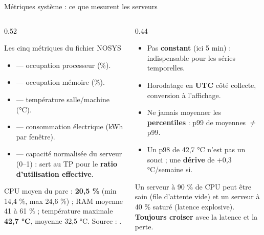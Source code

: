 \begin{frame}{Métriques système : ce que mesurent les serveurs}
\begin{columns}[t]
\begin{column}{0.52\textwidth}
\begin{block}{Les cinq métriques du fichier NOSYS}
\begin{itemize}
\item {} --- occupation processeur (\%).
\item {} --- occupation mémoire (\%).
\item {} --- température salle/machine (°C).
\item {} --- consommation électrique (kWh par fenêtre).
\item {} --- capacité normalisée du serveur (0--1) :
sert au TP pour le \textbf{ratio d'utilisation effective}.
\end{itemize}
\end{block}
\begin{ebox}
CPU moyen du parc : \textbf{20,5 \%} (min 14,4 \%, max 24,6 \%) ;
RAM moyenne 41 à 61 \% ; température maximale \textbf{42,7 °C},
moyenne 32,5 °C. Source : .
\end{ebox}
\end{column}
\begin{column}{0.44\textwidth}
\begin{kbox}
\begin{itemize}
\item Pas \textbf{constant} (ici 5 min) : indispensable pour les séries temporelles.
\item Horodatage en \textbf{UTC} côté collecte, conversion à l'affichage.
\item Ne jamais moyenner les \textbf{percentiles} : p99 de moyennes $\ne$ p99.
\item Un p98 de 42,7 °C n'est pas un souci ; une \textbf{dérive} de +0,3 °C/semaine si.
\end{itemize}
\end{kbox}
\begin{wbox}
Un serveur à 90 \% de CPU peut être sain (file d'attente vide)
et un serveur à 40 \% saturé (latence explosive).
\textbf{Toujours croiser} avec la latence et la perte.
\end{wbox}
\end{column}
\end{columns}
\end{frame}


